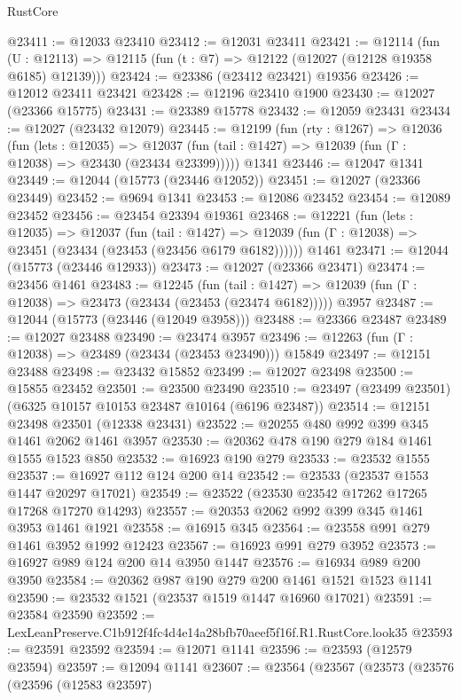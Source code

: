 \begin{lexlean}{RustCore}
\begin{coremodule}
@23411 := @12033 @23410
@23412 := @12031 @23411
@23421 := @12114
    (fun (U : @12113) => @12115 (fun (t : @7) => @12122 (@12027 (@12128 @19358 @6185) @12139)))
@23424 := @23386 (@23412 @23421) @19356
@23426 := @12012 @23411 @23421
@23428 := @12196 @23410 @1900
@23430 := @12027 (@23366 @15775)
@23431 := @23389 @15778
@23432 := @12059 @23431
@23434 := @12027 (@23432 @12079)
@23445 := @12199
    (fun (rty : @1267) =>
    @12036
      (fun (lets : @12035) =>
      @12037 (fun (tail : @1427) => @12039 (fun (Γ : @12038) => @23430 (@23434 @23399)))))
    @1341
@23446 := @12047 @1341
@23449 := @12044 (@15773 (@23446 @12052))
@23451 := @12027 (@23366 @23449)
@23452 := @9694 @1341
@23453 := @12086 @23452
@23454 := @12089 @23452
@23456 := @23454 @23394 @19361
@23468 := @12221
    (fun (lets : @12035) =>
    @12037
      (fun (tail : @1427) =>
      @12039 (fun (Γ : @12038) => @23451 (@23434 (@23453 (@23456 @6179 @6182))))))
    @1461
@23471 := @12044 (@15773 (@23446 @12933))
@23473 := @12027 (@23366 @23471)
@23474 := @23456 @1461
@23483 := @12245
    (fun (tail : @1427) => @12039 (fun (Γ : @12038) => @23473 (@23434 (@23453 (@23474 @6182)))))
    @3957
@23487 := @12044 (@15773 (@23446 (@12049 @3958)))
@23488 := @23366 @23487
@23489 := @12027 @23488
@23490 := @23474 @3957
@23496 := @12263 (fun (Γ : @12038) => @23489 (@23434 (@23453 @23490))) @15849
@23497 := @12151 @23488
@23498 := @23432 @15852
@23499 := @12027 @23498
@23500 := @15855 @23452
@23501 := @23500 @23490
@23510 := @23497 (@23499 @23501) (@6325 @10157 @10153 @23487 @10164 (@6196 @23487))
@23514 := @12151 @23498 @23501 (@12338 @23431)
@23522 := @20255 @480 @992 @399 @345 @1461 @2062 @1461 @3957
@23530 := @20362 @478 @190 @279 @184 @1461 @1555 @1523 @850
@23532 := @16923 @190 @279
@23533 := @23532 @1555
@23537 := @16927 @112 @124 @200 @14
@23542 := @23533 (@23537 @1553 @1447 @20297 @17021)
@23549 := @23522 (@23530 @23542 @17262 @17265 @17268 @17270 @14293)
@23557 := @20353 @2062 @992 @399 @345 @1461 @3953 @1461 @1921
@23558 := @16915 @345
@23564 := @23558 @991 @279 @1461 @3952 @1992 @12423
@23567 := @16923 @991 @279 @3952
@23573 := @16927 @989 @124 @200 @14 @3950 @1447
@23576 := @16934 @989 @200 @3950
@23584 := @20362 @987 @190 @279 @200 @1461 @1521 @1523 @1141
@23590 := @23532 @1521 (@23537 @1519 @1447 @16960 @17021)
@23591 := @23584 @23590
@23592 := LexLeanPreserve.C1b912f4fc4d4e14a28bfb70aeef5f16f.R1.RustCore.look35
@23593 := @23591 @23592
@23594 := @12071 @1141
@23596 := @23593 (@12579 @23594)
@23597 := @12094 @1141
@23607 := @23564
    (@23567
      (@23573
        (@23576
          (@23596
            (@12583 @23597)

\end{coremodule}
\end{lexlean}
